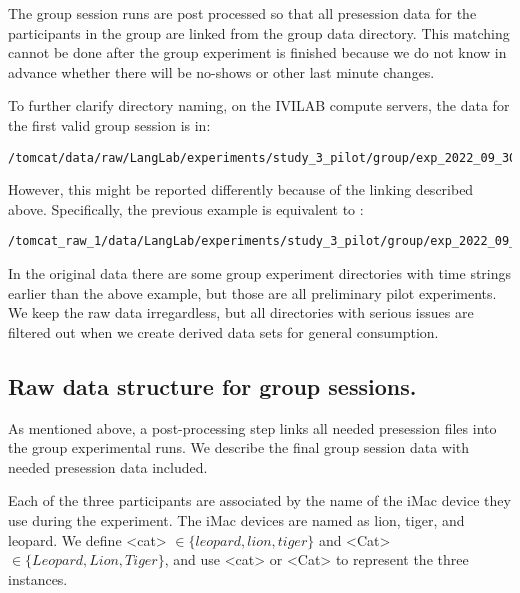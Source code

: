 The group session runs are post processed so that all presession data for the
participants in the group are linked from the group data directory. This
matching cannot be done after the group experiment is finished because we do not
know in advance whether there will be no-shows or other last minute changes.

To further clarify directory naming, on the IVILAB compute servers,
the data for the first valid group session is in:
\begin{lstlisting}
/tomcat/data/raw/LangLab/experiments/study_3_pilot/group/exp_2022_09_30_10
\end{lstlisting}
However, this might be reported  differently because of the linking described
above. Specifically, the previous example is equivalent to :
\begin{lstlisting}
/tomcat_raw_1/data/LangLab/experiments/study_3_pilot/group/exp_2022_09_30_10
\end{lstlisting}
In the original data there are some group experiment directories with time
strings earlier than the above example, but those are all preliminary pilot
experiments. We keep the raw data irregardless, but all directories with serious
issues are filtered out when we create derived data sets for general
consumption.

\subsection{Raw data structure for group sessions.}

As mentioned above, a post-processing step links all needed presession files into
the group experimental runs. We describe the final group session data with
needed presession data included.


Each of the three participants are associated by the name of the iMac device
they use during the experiment.
The iMac devices are named as lion, tiger, and
leopard. We define
<cat> $\in \{leopard, lion, tiger\}$
and <Cat> $\in \{Leopard, Lion, Tiger\}$,
and use <cat> or <Cat> to represent the three instances.



